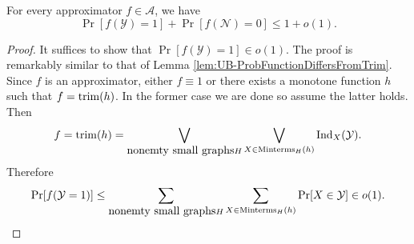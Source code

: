 \documentclass[11pt]{article}
\begin{document}
 	\begin{lemma}
 		\label{lem:UB-FunctionValues}
 		For every approximator $f \in \mathcal{A}$, we have
 		\[\Pr[f(\mathcal{Y}) = 1] + \Pr[f(\mathcal{N}) = 0] \leq 1 + o(1).\]
 	\end{lemma}
 	\begin{proof}
 		It suffices to show that $\Pr[f(\mathcal{Y}) = 1] \in o(1)$. The proof is remarkably similar to that of Lemma \ref{lem:UB-ProbFunctionDiffersFromTrim}. Since $f$ is an approximator, either $f \equiv 1$ or there exists a monotone function $h$ such that $f = \mathrm{trim}(h)$. In the former case we are done so assume the latter holds. Then
 		\[f = \mathrm{trim}(h) = \bigvee_{\mbox{nonemty small graphs} H}\bigvee_{X \in \mathrm{Minterms}_H(h)} \mathrm{Ind}_X(\mathcal{Y}).\]
 		Therefore
 		\[\Pr[f(\mathcal{Y} = 1)] \leq \sum_{\mbox{nonemty small graphs} H}\sum_{X \in \mathrm{Minterms}_H(h)} \Pr[X\in\mathcal{Y}] \in o(1).\]
 	\end{proof}
\end{document}
